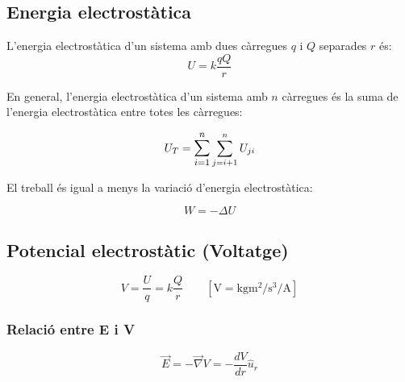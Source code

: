 \subsection{Energia electrostàtica}
\begin{multicols}{2}

    \label{sub:energia_electrostatica}
    L'energia electrostàtica d'un sistema amb dues càrregues $q$ i $Q$ separades $r$ és:
    \begin{equation}
        U = k \frac{qQ}{r}
    \end{equation}

    En general, l'energia electrostàtica d'un sistema amb $n$ càrregues és la suma
    de l'energia electrostàtica entre totes les càrregues:

    \begin{equation}
        U_T = \mathlarger{\sum_{i=1}^n} \sum_{j=i+1}^n U_{ji}
    \end{equation}

    El treball és igual a menys la variació d'energia electrostàtica:

    \begin{equation}
        W = - \Delta U
    \end{equation}

\end{multicols}

\subsection{Potencial electrostàtic (Voltatge)}
\label{sub:potencial_electrostatic_voltatge_}

\begin{multicols}{2}

    \begin{equation}
        V = \frac{U}{q} = k \frac{Q}{r} \qquad \left[\si{\volt} = \si{\kilo\gram\metre\squared\per\second\cubed\per\ampere} \right]
    \end{equation}

    \subsubsection{Relació entre E i V}
    \label{ssub:relacio_entre_e_i_v}

    \begin{equation}
        \vec{E} = - \vec{\nabla} V = - \frac{dV}{dr} \hat{u}_r
    \end{equation}


\end{multicols}


